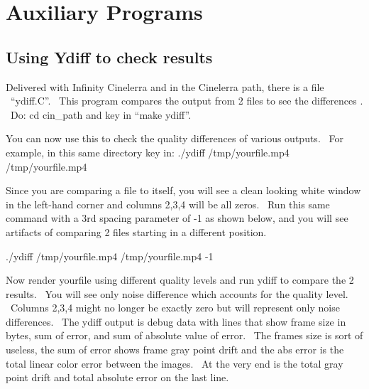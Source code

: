\chapter{Auxiliary Programs}%
\label{cha:Auxiliary_Programs}
\section{Using Ydiff to check results}
\label{sec:Ydiff to check results}

Delivered with Infinity Cinelerra and in the Cinelerra path, there is a file \ {}``ydiff.C''. \ This program compares the output from 2 files to see the differences . \ Do: cd cin\_path and key in ``make ydiff''. 
\medskip

You can now use this to check the quality differences of various outputs. \ For example, in this same directory key in:
\hspace{2em}./ydiff /tmp/yourfile.mp4 /tmp/yourfile.mp4 
\medskip

Since you are comparing a file to itself, you will see a clean looking white window in the left-hand corner and columns 2,3,4 will be all zeros. \ Run this same command with a 3rd spacing parameter of {}-1 as shown below, and you will see artifacts of comparing 2 files starting in a different position.
\medskip

\hspace{2em}./ydiff /tmp/yourfile.mp4 /tmp/yourfile.mp4 -1
\medskip

Now render yourfile using different quality levels and run ydiff to compare the 2 results. \ You will see only noise difference which accounts for the quality level. \ Columns 2,3,4 might no longer be exactly zero but will represent only noise differences. \ The ydiff output is debug data with lines that show frame size in bytes, sum of error, and sum of absolute value of error. \ The frames size is sort of useless, the sum of error shows frame gray point drift and the abs error is the total linear color error between the images. \ At the very end is the total gray point drift and total absolute error on the last line.

